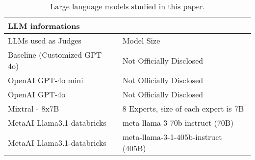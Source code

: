 \begin{table}[!thb]\footnotesize
\centering
\begin{tabular}{|lllll|}
\hline
\multicolumn{5}{|l|}{LLM informations}                         \\ \hline
\multicolumn{2}{|l|}{LLMs used as Judges}  & \multicolumn{3}{l|}{ Model Size} \\ \hline

\multicolumn{2}{|l|}{Baseline (Customized GPT-4o)}  & \multicolumn{3}{l|}{Not Officially Disclosed}      \\ \hline

\multicolumn{2}{|l|}{OpenAI GPT-4o mini}  & \multicolumn{3}{l|}{Not Officially Disclosed}      \\ \hline
\multicolumn{2}{|l|}{OpenAI GPT-4o}  & \multicolumn{3}{l|}{Not Officially Disclosed}      \\ \hline
\multicolumn{2}{|l|}{Mixtral - 8x7B } & \multicolumn{3}{l|}{8 Experts, size of each expert is 7B}      \\ \hline
\multicolumn{2}{|l|}{MetaAI Llama3.1-databricks} & \multicolumn{3}{l|}{meta-llama-3-70b-instruct  (70B)}      \\ \hline
\multicolumn{2}{|l|}{MetaAI Llama3.1-databricks} & \multicolumn{3}{l|}{meta-llama-3-1-405b-instruct (405B)}      \\ \hline






\end{tabular}%
\caption{Large language models studied in this paper.}
\label{tab:LLMs}
\end{table}

